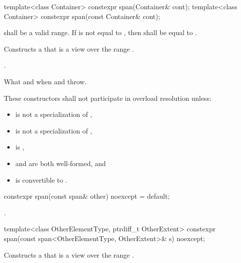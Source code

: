 \begin{codeblock}
\begin{codeblock}
\begin{codeblock}
%
\begin{itemdecl}
template<class Container> constexpr span(Container& cont);
template<class Container> constexpr span(const Container& cont);
\end{itemdecl}
\begin{itemdescr}
\pnum
\requires
{} shall be a valid range.
If  is not equal to ,
then  shall be equal to .

\pnum
\effects
Constructs a  that is a view over the range .

\pnum
\postconditions
{}.

\pnum
\throws
What and when  and  throw.

\pnum
\remarks
These constructors shall not participate in overload resolution unless:
\begin{itemize}
\item {} is not a specialization of ,
\item {} is not a specialization of ,
\item {} is ,
\item {} and  are both well-formed, and
\item {} is convertible to .
\end{itemize}
\end{itemdescr}

%
\begin{itemdecl}
constexpr span(const span& other) noexcept = default;
\end{itemdecl}
\begin{itemdescr}
\pnum
\postconditions
{}.
\end{itemdescr}

%
\begin{itemdecl}
template<class OtherElementType, ptrdiff_t OtherExtent>
  constexpr span(const span<OtherElementType, OtherExtent>& s) noexcept;
\end{itemdecl}
\begin{itemdescr}
\pnum
\effects
Constructs a  that is a view over the range
.


\end{itemdescr}
\end{codeblock}
\end{codeblock}
\end{codeblock}
